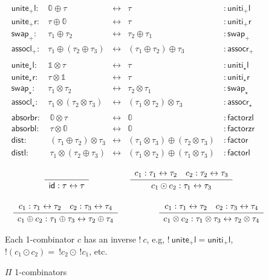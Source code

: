 \documentclass[a4paper,USenglish]{lipics-v2016-utf8x}
\newcommand{\iso}{\leftrightarrow}
\newcommand{\zt}{\mathbb{0}}
\newcommand{\ot}{\mathbb{1}}
\newcommand{\Rule}[4]{
\makebox{{\rm #1}
$\displaystyle
\frac{\begin{array}{l}#2\\\end{array}}
{\begin{array}{l}#3\\\end{array}}$
 #4}}
\newcommand{\jdg}[3]{{#1} #3}
\newcommand{\unitepl}{\mathsf{{unite_+l}}}
\newcommand{\unitipl}{\mathsf{{uniti_+l}}}
\newcommand{\unitepr}{\mathsf{{unite_+r}}}
\newcommand{\unitipr}{\mathsf{{uniti_+r}}}
\newcommand{\swapp}{\mathsf{{swap_+}}}
\newcommand{\assoclp}{\mathsf{{assocl_+}}}
\newcommand{\assocrp}{\mathsf{{assocr_+}}}
\newcommand{\unitetl}{\mathsf{{unite_{\star}l}}}
\newcommand{\unititl}{\mathsf{{uniti_{\star}l}}}
\newcommand{\unitetr}{\mathsf{{unite_{\star}r}}}
\newcommand{\unititr}{\mathsf{{uniti_{\star}r}}}
\newcommand{\swapt}{\mathsf{{swap_{\star}}}}
\newcommand{\assoclt}{\mathsf{{assocl_{\star}}}}
\newcommand{\assocrt}{\mathsf{{assocr_{\star}}}}
\newcommand{\absorbr}{\mathsf{{absorbr}}}
\newcommand{\absorbl}{\mathsf{{absorbl}}}
\newcommand{\factorzr}{\mathsf{{factorzr}}}
\newcommand{\factorzl}{\mathsf{{factorzl}}}
\newcommand{\dist}{\mathsf{{dist}}}
\newcommand{\factor}{\mathsf{{factor}}}
\newcommand{\distl}{\mathsf{{distl}}}
\newcommand{\factorl}{\mathsf{{factorl}}}
\newcommand{\idiso}{\mathsf{{id}}}
\begin{document}
\begin{figure}[t]
\[\begin{array}{rrcll}
\unitepl :&  \zt \oplus \tau & \iso & \tau &: \unitipl \\
\unitepr :&  \tau \oplus \zt & \iso & \tau &: \unitipr \\
\swapp :&  \tau_1 \oplus \tau_2 & \iso & \tau_2 \oplus \tau_1 &: \swapp \\
\assoclp :&  \tau_1 \oplus (\tau_2 \oplus \tau_3) & \iso & (\tau_1 \oplus \tau_2) \oplus \tau_3
  &: \assocrp \\
\\
\unitetl :&  \ot \otimes \tau & \iso & \tau &: \unititl \\
\unitetr :&  \tau \otimes \ot & \iso & \tau &: \unititr \\
\swapt :&  \tau_1 \otimes \tau_2 & \iso & \tau_2 \otimes \tau_1 &: \swapt \\
\assoclt :&  \tau_1 \otimes (\tau_2 \otimes \tau_3) & \iso & (\tau_1 \otimes \tau_2) \otimes \tau_3
  &: \assocrt \\
\\
\absorbr :&~ \zt \otimes \tau & \iso & \zt &: \factorzl \\
\absorbl :&~ \tau \otimes \zt & \iso & \zt &: \factorzr \\
\dist :&~ (\tau_1 \oplus \tau_2) \otimes \tau_3 &
  \iso & (\tau_1 \otimes \tau_3) \oplus (\tau_2 \otimes \tau_3)~ &: \factor \\
\distl :&~ \tau_1 \otimes (\tau_2 \oplus \tau_3) &
  \iso & (\tau_1 \otimes \tau_2) \oplus (\tau_1 \otimes \tau_3)~ &: \factorl
\end{array}\]

\[\begin{array}{c}
\Rule{}
{}
{\jdg{}{}{\idiso : \tau \iso \tau}}
{}
\qquad\qquad
\Rule{}
{\jdg{}{}{c_1 : \tau_1 \iso \tau_2} \quad c_2 : \tau_2 \iso \tau_3}
{\jdg{}{}{c_1 \odot c_2 : \tau_1 \iso \tau_3}}
{}
\\
\\
\Rule{}
{\jdg{}{}{c_1 : \tau_1 \iso \tau_2} \quad c_2 : \tau_3 \iso \tau_4}
{\jdg{}{}{c_1 \oplus c_2 : \tau_1 \oplus \tau_3 \iso \tau_2 \oplus \tau_4}}
{}
\qquad\qquad
\Rule{}
{\jdg{}{}{c_1 : \tau_1 \iso \tau_2} \quad c_2 : \tau_3 \iso \tau_4}
{\jdg{}{}{c_1 \otimes c_2 : \tau_1 \otimes \tau_3 \iso \tau_2 \otimes \tau_4}}
{}
\end{array}\]

Each 1-combinator $c$ has an inverse $!~c$, e.g, $!~\unitepl=\unitipl$,
$!(c_1 \odot c_2) = ~!c_2 \odot~ !c_1$, etc.
\caption{$\Pi$ 1-combinators~\cite{James:2012:IE:2103656.2103667}
\label{pi-combinators}}
\end{figure}
\end{document}
